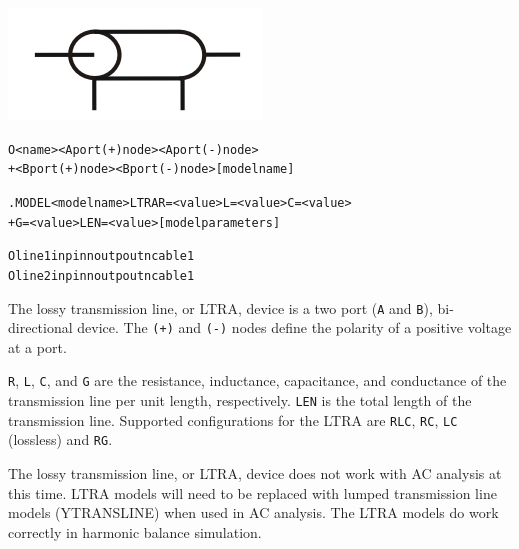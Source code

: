 


\begin{Device}

\symbol
{\includegraphics{translineSymbol}}

\device
\begin{alltt}
O<name> <A port (+) node> <A port (-) node>
+ <B port (+) node> <B port (-) node> [model name]
\end{alltt}

\model
\begin{alltt}
.MODEL <model name> LTRA R=<value> L=<value> C=<value>
+ G=<value> LEN=<value> [model parameters]
\end{alltt}

\examples
\begin{alltt}
Oline1 inp inn outp outn cable1
Oline2 inp inn outp outn cable1
\end{alltt}

\comments

The lossy transmission line, or LTRA, device is a two port (\texttt{A}
and \texttt{B}), bi-directional device. The \texttt{(+)} and \texttt{(-)} nodes
define the polarity of a positive voltage at a port.

\texttt{R}, \texttt{L}, \texttt{C}, and \texttt{G} are the resistance,
inductance, capacitance, and conductance of the transmission line per unit
length, respectively. \texttt{LEN} is the total length of the transmission
line. Supported configurations for the LTRA are \texttt{RLC}, \texttt{RC},
\texttt{LC} (lossless) and \texttt{RG}.

The lossy transmission line, or LTRA, device does not work with AC
analysis at this time.  LTRA models will need to be replaced with
lumped transmission line models (YTRANSLINE) when used in AC analysis.
The LTRA models do work correctly in harmonic balance simulation.
\end{Device}


